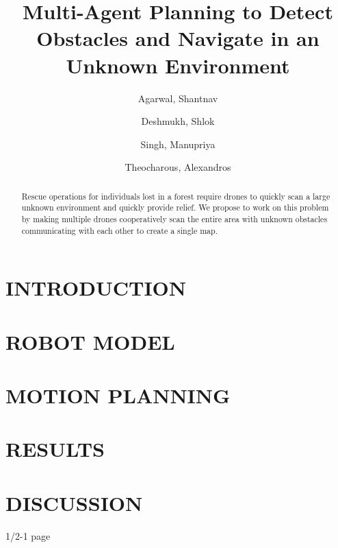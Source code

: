 \documentclass[a4paper, 11pt, conference]{ieeeconf}      %
\title{\LARGE \bf Multi-Agent Planning to Detect Obstacles and Navigate in an Unknown Environment}
\author{
  Agarwal, Shantnav\\
  \text{5939933}
  \and
  Deshmukh, Shlok\\
  \text{5928516}
  \and
  Singh, Manupriya\\
  \text{6050425}
  \and
  Theocharous, Alexandros\\
  \text{5930901}
}
\begin{document}
\maketitle
\thispagestyle{empty}
\pagestyle{empty}


\begin{abstract}
 Rescue operations for individuals lost in a forest require drones to quickly scan a large unknown environment and quickly provide relief. We propose to work on this problem by making multiple drones cooperatively scan the entire area with unknown obstacles communicating with each other to create a single map.
\end{abstract}

\section{INTRODUCTION}

\section{ROBOT MODEL}
 
\section{MOTION PLANNING}


\section{RESULTS}

\section{DISCUSSION}

1/2-1 page
 

\addtolength{\textheight}{-12cm}   %












\end{document}

